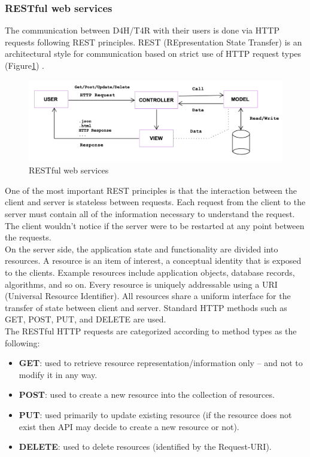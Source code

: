 \documentclass[a4paper, hidelinks, 12pt]{report}
\begin{document}
	\subsubsection{RESTful web services}
	The communication between D4H/T4R with their users is done via HTTP requests following REST principles. REST (REpresentation State Transfer) is an architectural style for communication based on strict use of HTTP request types (Figure\ref{fig:RESTful web services}) .\\
	
	\begin{figure}[H]
    		\centering
		\includegraphics[width=1\textwidth]{diagrams/mvc.png}
		\caption[RESTful web services]{RESTful web services}
		\label{fig:RESTful web services}
	\end{figure}
	 
	One of the most important REST principles is that the interaction between the client and server is stateless between requests. Each request from the client to the server must contain all of the information necessary to understand the request. The client wouldn't notice if the server were to be restarted at any point between the requests.\\
	
	On the server side, the application state and functionality are divided into resources. A resource is an item of interest, a conceptual identity that is exposed to the clients. Example resources include application objects, database records, algorithms, and so on. Every resource is uniquely addressable using a URI (Universal Resource Identifier). All resources share a uniform interface for the transfer of state between client and server. Standard HTTP methods such as GET, POST, PUT, and DELETE are used. \\
	
	The RESTful HTTP requests are categorized according to method types as the following:
	\begin{itemize}
	\item {\textbf{GET}}: used to retrieve resource representation/information only – and not to modify it in any way. 
	\item {\textbf{POST}}: used to create a new resource into the collection of resources.
	\item {\textbf{PUT}}: used primarily to update existing resource (if the resource does not exist then API may decide to create a new resource or not).
	\item {\textbf{DELETE}}: used to delete resources (identified by the Request-URI).
	\end{itemize}
	
\end{document}
